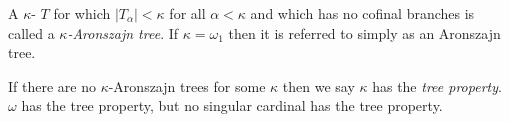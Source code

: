 \documentclass[12pt]{article}
\begin{document}
A $\kappa$- $T$ for which $|T_\alpha|<\kappa$ for all $\alpha<\kappa$ and which has no cofinal branches is called a \emph{$\kappa$-Aronszajn tree}.  If $\kappa=\omega_1$ then it is referred to simply as an Aronszajn tree.

If there are no $\kappa$-Aronszajn trees for some $\kappa$ then we say $\kappa$ has the \emph{tree property}.  $\omega$ has the tree property, but no singular cardinal has the tree property.
\end{document}
